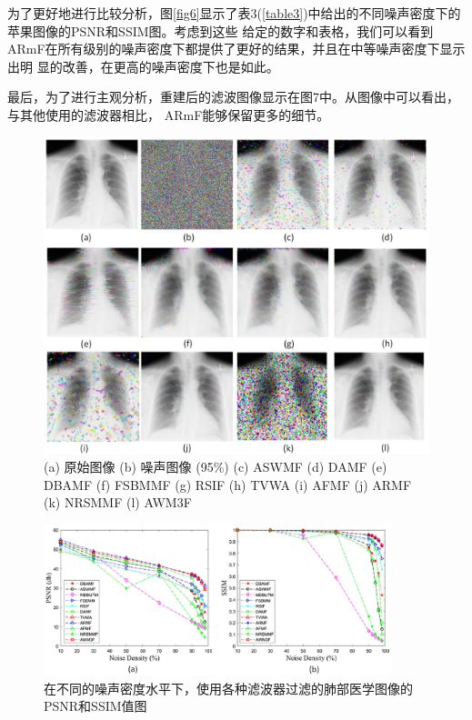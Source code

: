 \documentclass[12pt]{article} %
\begin{document}
\hspace{2em}为了更好地进行比较分析，图\ref{fig6}显示了表3(\ref{table3})中给出的不同噪声密度下的苹果图像的PSNR和SSIM图。考虑到这些
给定的数字和表格，我们可以看到ARmF\cite{ref8}在所有级别的噪声密度下都提供了更好的结果，并且在中等噪声密度下显示出明
显的改善，在更高的噪声密度下也是如此。

\hspace{2em}最后，为了进行主观分析，重建后的滤波图像显示在图7中。从图像中可以看出，与其他使用的滤波器相比，
ARmF\cite{ref8}能够保留更多的细节。

\begin{figure}[H]
    \centering
    \includegraphics[width=1\textwidth]{images/11.eps}
    \caption{(a) 原始图像 (b) 噪声图像 (95\%) (c) ASWMF (d) DAMF (e) DBAMF (f) FSBMMF (g) RSIF (h) TVWA (i) AFMF (j) ARMF (k) NRSMMF (l) AWM3F}
    \label{fig8}
\end{figure}

\begin{figure}[H]
    \centering
    \includegraphics[width=0.9\textwidth]{images/12.eps}
    \caption{在不同的噪声密度水平下，使用各种滤波器过滤的肺部医学图像的PSNR和SSIM值图}
    \label{fig9}
\end{figure}
\end{document}
